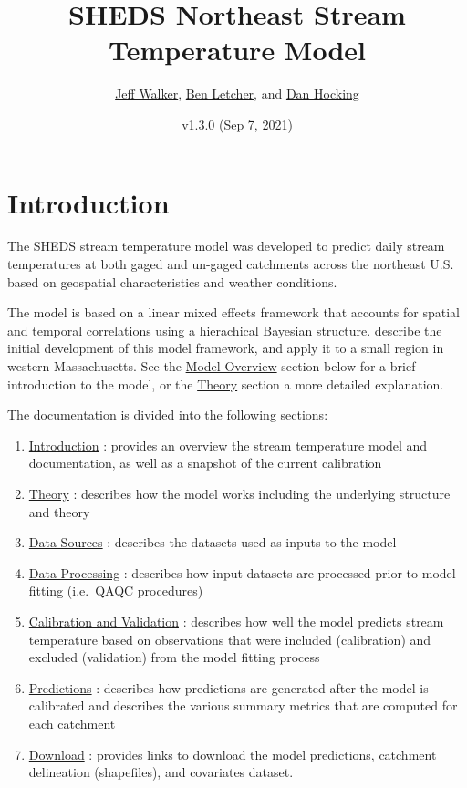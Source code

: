 \documentclass[]{book}
\title{SHEDS Northeast Stream Temperature Model}
\author{\href{https://walkerenvres.com}{Jeff Walker}, \href{https://www.lsc.usgs.gov/?q=cafb-ben-letcher}{Ben Letcher}, and \href{https://hockinglab.weebly.com/}{Dan Hocking}}
\date{v1.3.0 (Sep 7, 2021)}
\providecommand{\tightlist}{%
  \setlength{\itemsep}{0pt}\setlength{\parskip}{0pt}}
\begin{document}
\maketitle

{
\setcounter{tocdepth}{1}
\tableofcontents
}
\hypertarget{intro}{%
\chapter{Introduction}\label{intro}}

The SHEDS stream temperature model was developed to predict daily stream temperatures at both gaged and un-gaged catchments across the northeast U.S. based on geospatial characteristics and weather conditions.

The model is based on a linear mixed effects framework that accounts for spatial and temporal correlations using a hierachical Bayesian structure. \citet{Letcher2016} describe the initial development of this model framework, and apply it to a small region in western Massachusetts. See the \protect\hyperlink{model-overview}{Model Overview} section below for a brief introduction to the model, or the \protect\hyperlink{theory}{Theory} section a more detailed explanation.

The documentation is divided into the following sections:

\begin{enumerate}
\def\labelenumi{\arabic{enumi}.}
\tightlist
\item
  \protect\hyperlink{intro}{Introduction} : provides an overview the stream temperature model and documentation, as well as a snapshot of the current calibration
\item
  \protect\hyperlink{theory}{Theory} : describes how the model works including the underlying structure and theory
\item
  \protect\hyperlink{data-sources}{Data Sources} : describes the datasets used as inputs to the model
\item
  \protect\hyperlink{data-processing}{Data Processing} : describes how input datasets are processed prior to model fitting (i.e.~QAQC procedures)
\item
  \protect\hyperlink{calibration-and-validation}{Calibration and Validation} : describes how well the model predicts stream temperature based on observations that were included (calibration) and excluded (validation) from the model fitting process
\item
  \protect\hyperlink{predictions}{Predictions} : describes how predictions are generated after the model is calibrated and describes the various summary metrics that are computed for each catchment
\item
  \protect\hyperlink{download}{Download} : provides links to download the model predictions, catchment delineation (shapefiles), and covariates dataset.
\end{enumerate}
\end{document}
